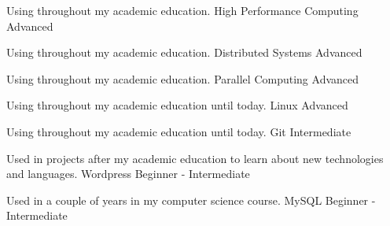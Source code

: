 \begin{cventries}

  \cventry
  {Using throughout my academic education.}
  {High Performance Computing}
  {Advanced}
  {}
  {}

  \cventry
  {Using throughout my academic education.}
  {Distributed Systems}
  {Advanced}
  {}
  {}

  \cventry
  {Using throughout my academic education.}
  {Parallel Computing}
  {Advanced}
  {}
  {}

  \cventry
  {Using throughout my academic education until today.}
  {Linux}
  {Advanced}
  {}
  {}

  \cventry
  {Using throughout my academic education until today.}
  {Git}
  {Intermediate}
  {}
  {}

  \cventry
  {Used in projects after my academic education to learn about new technologies and
  languages.}
  {Wordpress} %
  {Beginner - Intermediate} %
  {}
  {}

  \cventry
  {Used in a couple of years in my computer science course.}
  {MySQL} %
  {Beginner - Intermediate} %
  {}
  {}


\end{cventries}
